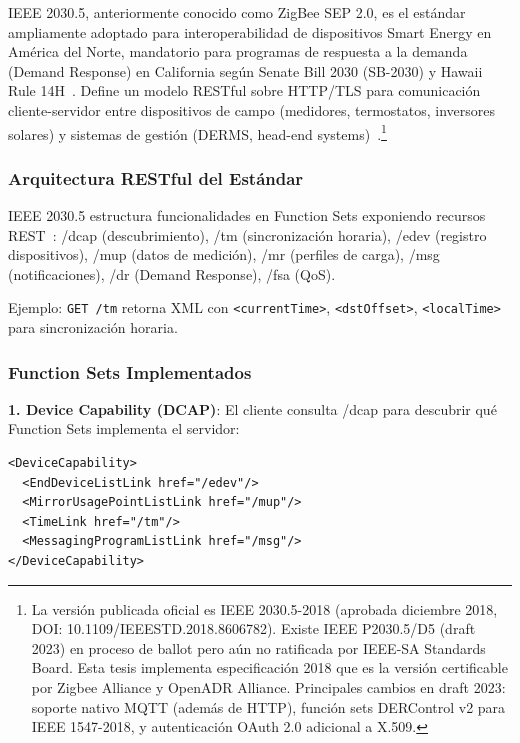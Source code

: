 IEEE 2030.5, anteriormente conocido como ZigBee SEP 2.0, es el estándar ampliamente adoptado para interoperabilidad de dispositivos Smart Energy en América del Norte, mandatorio para programas de respuesta a la demanda (Demand Response) en California según Senate Bill 2030 (SB-2030) y Hawaii Rule 14H~\cite{IEEERecommendedPractice,CaliforniaCPUC2023,knyazevComparativeAnalysisStandards2017}. Define un modelo RESTful sobre HTTP/TLS para comunicación cliente-servidor entre dispositivos de campo (medidores, termostatos, inversores solares) y sistemas de gestión (DERMS, head-end systems)~\cite{tangResearchInteroperabilityIoT}.\footnote{La versión publicada oficial es IEEE 2030.5-2018 (aprobada diciembre 2018, DOI: 10.1109/IEEESTD.2018.8606782). Existe IEEE P2030.5/D5 (draft 2023) en proceso de ballot pero aún no ratificada por IEEE-SA Standards Board. Esta tesis implementa especificación 2018 que es la versión certificable por Zigbee Alliance y OpenADR Alliance. Principales cambios en draft 2023: soporte nativo MQTT (además de HTTP), función sets DERControl v2 para IEEE 1547-2018, y autenticación OAuth 2.0 adicional a X.509.}

\subsubsection{Arquitectura RESTful del Estándar}

IEEE 2030.5 estructura funcionalidades en Function Sets exponiendo recursos REST~\cite{IEEERecommendedPractice}: /dcap (descubrimiento), /tm (sincronización horaria), /edev (registro dispositivos), /mup (datos de medición), /mr (perfiles de carga), /msg (notificaciones), /dr (Demand Response), /fsa (QoS).

Ejemplo: \texttt{GET /tm} retorna XML con \texttt{<currentTime>}, \texttt{<dstOffset>}, \texttt{<localTime>} para sincronización horaria.

\subsubsection{Function Sets Implementados}

\textbf{1. Device Capability (DCAP)}: El cliente consulta /dcap para descubrir qué Function Sets implementa el servidor:

\begin{verbatim}
<DeviceCapability>
  <EndDeviceListLink href="/edev"/>
  <MirrorUsagePointListLink href="/mup"/>
  <TimeLink href="/tm"/>
  <MessagingProgramListLink href="/msg"/>
</DeviceCapability>
\end{verbatim}

